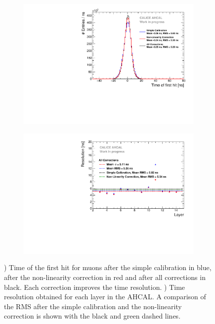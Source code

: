 \begin{figure}[htbp!]
	\begin{subfigure}[t]{0.49\textwidth}
		\centering
		\includegraphics[width=1\textwidth]{../Thesis_Plots/Timing/Muons/Plots/Timing_AHCAL_AllCorrection.pdf}
		\caption{}\label{fig:timing_muons}
	\end{subfigure}
	\hfill
	\begin{subfigure}[t]{0.49\textwidth}
		\centering
		\includegraphics[width=1\textwidth]{../Thesis_Plots/Timing/Muons/Plots/ResolutionPerModule_AllCorrection.pdf}
		\caption{}\label{fig:timing_reso_all_muons}
	\end{subfigure}
	\caption{) Time of the first hit for muons after the simple calibration in blue, after the non-linearity correction in red and after all corrections in black. Each correction improves the time resolution. ) Time resolution obtained for each layer in the AHCAL. A comparison of the RMS after the simple calibration and the non-linearity correction is shown with the black and green dashed lines.}
\end{figure}

